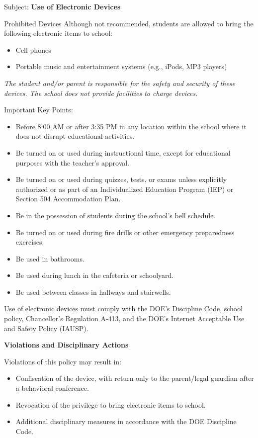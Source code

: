 \documentclass[letterpaper, 12pt]{article}
\begin{document}
Subject: \textbf{Use of Electronic Devices}
\begin{redbox}[PS 192 | Policy]
Prohibited Devices
Although not recommended, students are allowed to bring the following electronic items to school:
\begin{itemize}
\item Cell phones
\item Portable music and entertainment systems (e.g., iPods, MP3 players)
\end{itemize}
\textit{The student and/or parent is responsible for the safety and security of these devices. The school does not provide facilities to charge devices.}
\vspace*{3mm}

Important Key Points:
\begin{itemize}
\item Before 8:00 AM or after 3:35 PM in any location within the school where it does not disrupt educational activities.
\item Be turned on or used during instructional time, except for educational purposes with the teacher's approval.
\item Be turned on or used during quizzes, tests, or exams unless explicitly authorized or as part of an Individualized Education Program (IEP) or Section 504 Accommodation Plan.
\item Be in the possession of students during the school's bell schedule.
\item Be turned on or used during fire drills or other emergency preparedness exercises.
\item Be used in bathrooms.
\item Be used during lunch in the cafeteria or schoolyard.
\item Be used between classes in hallways and stairwells.
\end{itemize}
\end{redbox}

Use of electronic devices must comply with the DOE’s Discipline Code, school policy, Chancellor’s Regulation A-413, and the DOE’s Internet Acceptable Use and Safety Policy (IAUSP).

\pagebreak
\vspace*{-0.2cm}

\textbf{\textbf{Violations and Disciplinary Actions}}

Violations of this policy may result in:
\begin{itemize}
\item Confiscation of the device, with return only to the parent/legal guardian after a behavioral conference.
\item Revocation of the privilege to bring electronic items to school.
\item Additional disciplinary measures in accordance with the DOE Discipline Code.
\end{itemize}
\end{document}
